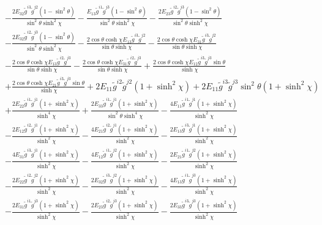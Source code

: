 \documentclass[10pt,letterpaper]{article}
\numberwithin{equation}{section}
\begin{document}
\begin{appendices}
\begin{eqnarray}
&& -  \frac{2 E_{32} \tilde{g}^{i3} \tilde{g}^{j2} (1 -  \sin^2\theta)}{\sin^2\theta \sinh^2\chi} -  \frac{E_{13} \tilde{g}^{i1} \tilde{g}^{j3} (1 -  \sin^2\theta)}{\sin^2\theta \sinh^2\chi} -  \frac{2 E_{23} \tilde{g}^{i2} \tilde{g}^{j3} (1 -  \sin^2\theta)}{\sin^2\theta \sinh^2\chi} \nonumber \\ 
&& -  \frac{2 E_{32} \tilde{g}^{i2} \tilde{g}^{j3} (1 -  \sin^2\theta)}{\sin^2\theta \sinh^2\chi} -  \frac{2 \cos\theta \cosh\chi E_{13} \tilde{g}^{i3} \tilde{g}^{j2}}{\sin\theta \sinh\chi} -  \frac{2 \cos\theta \cosh\chi E_{31} \tilde{g}^{i3} \tilde{g}^{j2}}{\sin\theta \sinh\chi} \nonumber \\ 
&& -  \frac{2 \cos\theta \cosh\chi E_{13} \tilde{g}^{i2} \tilde{g}^{j3}}{\sin\theta \sinh\chi} -  \frac{2 \cos\theta \cosh\chi E_{31} \tilde{g}^{i2} \tilde{g}^{j3}}{\sin\theta \sinh\chi} + \frac{2 \cos\theta \cosh\chi E_{12} \tilde{g}^{i3} \tilde{g}^{j3} \sin\theta}{\sinh\chi} \nonumber \\ 
&& + \frac{2 \cos\theta \cosh\chi E_{21} \tilde{g}^{i3} \tilde{g}^{j3} \sin\theta}{\sinh\chi} + 2 E_{11} \tilde{g}^{i2} \tilde{g}^{j2} (1 + \sinh^2\chi) + 2 E_{11} \tilde{g}^{i3} \tilde{g}^{j3} \sin^2\theta (1 + \sinh^2\chi) \nonumber \\ 
&& + \frac{2 E_{22} \tilde{g}^{i1} \tilde{g}^{j1} (1 + \sinh^2\chi)}{\sinh^4\chi} + \frac{2 E_{33} \tilde{g}^{i1} \tilde{g}^{j1} (1 + \sinh^2\chi)}{\sin^2\theta \sinh^4\chi} -  \frac{4 E_{11} \tilde{g}^{i1} \tilde{g}^{j1} (1 + \sinh^2\chi)}{\sinh^2\chi} \nonumber \\ 
&& -  \frac{2 E_{12} \tilde{g}^{i2} \tilde{g}^{j1} (1 + \sinh^2\chi)}{\sinh^2\chi} -  \frac{4 E_{21} \tilde{g}^{i2} \tilde{g}^{j1} (1 + \sinh^2\chi)}{\sinh^2\chi} -  \frac{2 E_{13} \tilde{g}^{i3} \tilde{g}^{j1} (1 + \sinh^2\chi)}{\sinh^2\chi} \nonumber \\ 
&& -  \frac{4 E_{31} \tilde{g}^{i3} \tilde{g}^{j1} (1 + \sinh^2\chi)}{\sinh^2\chi} -  \frac{4 E_{12} \tilde{g}^{i1} \tilde{g}^{j2} (1 + \sinh^2\chi)}{\sinh^2\chi} -  \frac{2 E_{21} \tilde{g}^{i1} \tilde{g}^{j2} (1 + \sinh^2\chi)}{\sinh^2\chi} \nonumber \\ 
&& -  \frac{2 E_{22} \tilde{g}^{i2} \tilde{g}^{j2} (1 + \sinh^2\chi)}{\sinh^2\chi} -  \frac{2 E_{32} \tilde{g}^{i3} \tilde{g}^{j2} (1 + \sinh^2\chi)}{\sinh^2\chi} -  \frac{4 E_{13} \tilde{g}^{i1} \tilde{g}^{j3} (1 + \sinh^2\chi)}{\sinh^2\chi} \nonumber \\ 
&& -  \frac{2 E_{31} \tilde{g}^{i1} \tilde{g}^{j3} (1 + \sinh^2\chi)}{\sinh^2\chi} -  \frac{2 E_{23} \tilde{g}^{i2} \tilde{g}^{j3} (1 + \sinh^2\chi)}{\sinh^2\chi} -  \frac{2 E_{33} \tilde{g}^{i3} \tilde{g}^{j3} (1 + \sinh^2\chi)}{\sinh^2\chi} \nonumber \\ 

\end{eqnarray}
\end{appendices}
\end{document}
